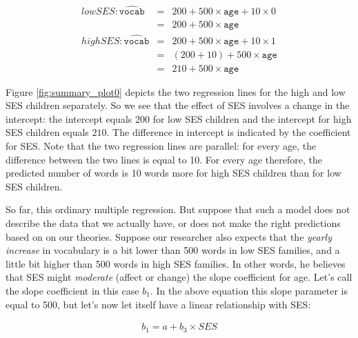 \begin{eqnarray}
low SES: \widehat{\texttt{vocab}} &=& 200 + 500 \times \texttt{age} + 10 \times 0  \\
&=& 200 + 500 \times \texttt{age} \\
high SES: \widehat{\texttt{vocab}} &=& 200 + 500 \times \texttt{age} + 10 \times 1  \\
&=& (200+10) + 500 \times \texttt{age} \\
&=& 210 + 500 \times \texttt{age}
\end{eqnarray}

Figure \ref{fig:summary_plot0} depicts the two regression lines for the high and low SES children separately. So we see that the effect of SES involves a change in the intercept: the intercept equals 200 for low SES children and the intercept for high SES children equals $210$. The difference in intercept is indicated by the coefficient for SES. Note that the two regression lines are parallel: for every age, the difference between the two lines is equal to 10. For every age therefore, the predicted number of words is 10 words more for high SES children than for low SES children.


\begin{knitrout}
\color{fgcolor}\begin{kframe}


{\ttfamily\noindent\bfseries{}}\end{kframe}
\end{knitrout}

So far, this ordinary multiple regression. But suppose that such a model does not describe the data that we actually have, or does not make the right predictions based on on our theories. Suppose our researcher also expects that the \textit{yearly increase} in vocabulary is a bit lower than 500 words in low SES families, and a little bit higher than 500 words in high SES families. In other words, he believes that SES might \textit{moderate} (affect or change) the slope coefficient for age. Let's call the slope coefficient in this case $b_1$. In the above equation this slope parameter is equal to 500, but let's now let itself have a linear relationship with SES:

\begin{eqnarray}
b_1 = a + b_3 \times SES
\end{eqnarray}

